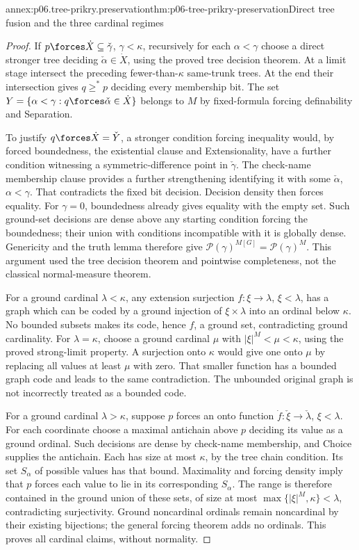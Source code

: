 \begin{annexitem}{annex:p06.tree-prikry.preservation}{thm:p06-tree-prikry-preservation}{Direct tree fusion and the three cardinal regimes}
\begin{proof}
If \(p\forces\dot X\subseteq\check\gamma\), \(\gamma<\kappa\),
recursively for each \(\alpha<\gamma\) choose a direct stronger tree
deciding \(\check\alpha\in\dot X\), using the proved tree decision
theorem. At a limit stage intersect the preceding fewer-than-\(\kappa\)
same-trunk trees. At the end their intersection gives \(q\geq^*p\)
deciding every membership bit. The set
\(Y=\{\alpha<\gamma:q\forces\check\alpha\in\dot X\}\) belongs
to \(M\) by fixed-formula forcing definability and Separation.

To justify \(q\forces\dot X=\check Y\), a stronger condition forcing
inequality would, by forced boundedness, the existential clause and
Extensionality, have a further condition witnessing a symmetric-difference
point in \(\check\gamma\). The check-name membership clause provides
a further strengthening identifying it with some \(\check\alpha\),
\(\alpha<\gamma\). That contradicts the fixed bit decision. Decision
density then forces equality. For \(\gamma=0\), boundedness already
gives equality with the empty set. Such ground-set decisions are dense
above any starting condition forcing the boundedness; their union with
conditions incompatible with it is globally dense. Genericity and the
truth lemma therefore give
\(\mathcal P(\gamma)^{M[G]}=\mathcal P(\gamma)^M\).
This argument used the tree decision theorem and pointwise completeness,
not the classical normal-measure theorem.

For a ground cardinal \(\lambda<\kappa\), any extension surjection
\(f:\xi\to\lambda\), \(\xi<\lambda\), has a graph which can be
coded by a ground injection of \(\xi\times\lambda\) into an ordinal
below \(\kappa\). No bounded subsets makes its code, hence \(f\),
a ground set, contradicting ground cardinality. For \(\lambda=\kappa\),
choose a ground cardinal \(\mu\) with \(|\xi|^M<\mu<\kappa\),
using the proved strong-limit property. A surjection onto \(\kappa\)
would give one onto \(\mu\) by replacing all values at least \(\mu\)
with zero. That smaller function has a bounded graph code and leads
to the same contradiction. The unbounded original graph is not incorrectly
treated as a bounded code.

For a ground cardinal \(\lambda>\kappa\), suppose \(p\) forces
an onto function \(\dot f:\check\xi\to\check\lambda\),
\(\xi<\lambda\). For each coordinate choose a maximal antichain
above \(p\) deciding its value as a ground ordinal. Such decisions
are dense by check-name membership, and Choice supplies the antichain.
Each has size at most \(\kappa\), by the tree chain condition.
Its set \(S_\alpha\) of possible values has that bound. Maximality
and forcing density imply that \(p\) forces each value to lie in its
corresponding \(S_\alpha\). The range is therefore contained in the
ground union of these sets, of size at most
\(\max\{|\xi|^M,\kappa\}<\lambda\), contradicting surjectivity.
Ground noncardinal ordinals remain noncardinal by their existing bijections;
the general forcing theorem adds no ordinals. This proves all cardinal
claims, without normality.


\end{proof}
\end{annexitem}
